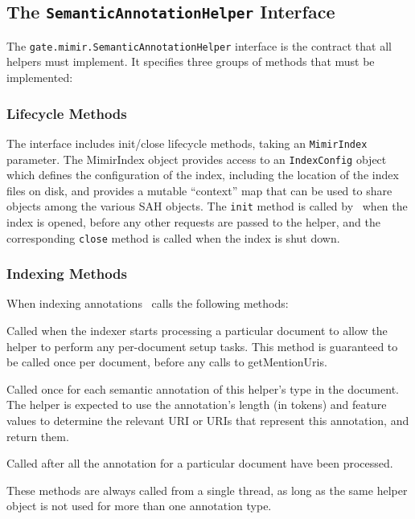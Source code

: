 \subsection{The {\tt SemanticAnnotationHelper} Interface}

The {\tt gate.mimir.SemanticAnnotationHelper} interface is the contract that
all helpers must implement.  It specifies three groups of methods that must be
implemented:

\subsubsection*{Lifecycle Methods}

The interface includes init/close lifecycle methods, taking an {\tt MimirIndex}
parameter. The MimirIndex object provides access to an {\tt IndexConfig} object
which defines the configuration of the index, including the location of the
index files on disk, and provides a mutable ``context'' map that can be used to
share objects among the various SAH objects.  The {\tt init} method is called by
\Mimir\ when the index is opened, before any other requests are passed to the
helper, and the corresponding {\tt close} method is called when the index is
shut down.

\subsubsection*{Indexing Methods}

When indexing annotations \Mimir\ calls the following methods:

\bde
\item[documentStart(document)] Called when the indexer starts processing a
  particular document to allow the helper to perform any per-document setup
  tasks.  This method is guaranteed to be called once per document, before any
  calls to getMentionUris.
\item[getMentionUris(annotation, length, indexer)] Called once for each
  semantic annotation of this helper's type in the document.  The helper is
  expected to use the annotation's length (in tokens) and feature values to
  determine the relevant URI or URIs that represent this annotation, and return
  them. 
\item[documentEnd()] Called after all the annotation for a particular document
  have been processed.
\ede

These methods are always called from a single thread, as long as the same 
helper object is not used for more than one annotation type.

